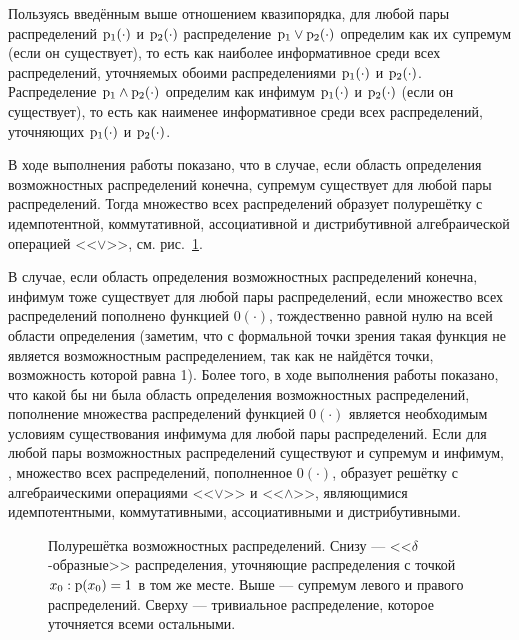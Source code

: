 Пользуясь введённым выше отношением квазипорядка, для любой пары распределений ${\mathrm{p}}_1(\cdot)$ и ${\mathrm{p}}_2(\cdot)$ распределение ${\mathrm{p}}_1\vee{\mathrm{p}}_2(\cdot)$ определим как их супремум (если он существует), то есть как наиболее информативное среди всех распределений, уточняемых обоими распределениями ${\mathrm{p}}_1(\cdot)$ и ${\mathrm{p}}_2(\cdot)$. Распределение ${\mathrm{p}}_1\wedge{\mathrm{p}}_2(\cdot)$ определим как инфимум ${\mathrm{p}}_1(\cdot)$ и ${\mathrm{p}}_2(\cdot)$ (если он существует), то есть как наименее информативное среди всех распределений, уточняющих ${\mathrm{p}}_1(\cdot)$ и ${\mathrm{p}}_2(\cdot)$.

В ходе выполнения работы показано, что в случае, если область определения возможностных распределений конечна, супремум существует для любой пары распределений.  Тогда множество всех распределений образует полурешётку с идемпотентной, коммутативной, ассоциативной и дистрибутивной алгебраической операцией <<$\vee$>>, см. рис.~\ref{ris:half_lattice}. 
\begin{notice}
В случае, если область определения возможностных распределений конечна, инфимум тоже существует для любой пары распределений, если множество всех распределений пополнено функцией $0(\cdot)$, тождественно равной нулю на всей области определения (заметим, что с формальной точки зрения такая функция не является возможностным распределением, так как не найдётся точки, возможность которой равна 1). Более того, в ходе выполнения работы показано, что какой бы ни была область определения возможностных распределений, пополнение множества распределений функцией $0(\cdot)$ является необходимым условиям существования инфимума для любой пары распределений. Если для любой пары возможностных распределений существуют и супремум и инфимум, , множество всех распределений, пополненное $0(\cdot)$, образует решётку с алгебраическими операциями <<$\vee$>> и <<$\wedge$>>, являющимися идемпотентными, коммутативными, ассоциативными и дистрибутивными.
\end{notice}

\begin{figure}[h]
\caption{\small Полурешётка возможностных распределений. Снизу --- <<$\delta$-образные>> распределения, уточняющие распределения с точкой $x_0: {\mathrm{p}}(x_0)=1$ в том же месте. Выше --- супремум левого и правого распределений. Сверху --- тривиальное распределение, которое уточняется всеми остальными. }
\label{ris:half_lattice}
\end{figure}

